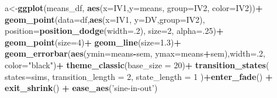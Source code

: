 \documentclass[
]{book}
\newenvironment{Shaded}{\begin{snugshade}}{\end{snugshade}}
\newcommand{\DataTypeTok}[1]{\textcolor[rgb]{0.13,0.29,0.53}{#1}}
\newcommand{\DecValTok}[1]{\textcolor[rgb]{0.00,0.00,0.81}{#1}}
\newcommand{\FloatTok}[1]{\textcolor[rgb]{0.00,0.00,0.81}{#1}}
\newcommand{\KeywordTok}[1]{\textcolor[rgb]{0.13,0.29,0.53}{\textbf{#1}}}
\newcommand{\NormalTok}[1]{#1}
\newcommand{\OperatorTok}[1]{\textcolor[rgb]{0.81,0.36,0.00}{\textbf{#1}}}
\newcommand{\StringTok}[1]{\textcolor[rgb]{0.31,0.60,0.02}{#1}}
\begin{document}
\begin{Shaded}
\begin{Highlighting}[]
{{{{\NormalTok{a<-}\KeywordTok{ggplot}\NormalTok{(means_df, }\KeywordTok{aes}\NormalTok{(}\DataTypeTok{x=}\NormalTok{IV1,}\DataTypeTok{y=}\NormalTok{means, }
                                           \DataTypeTok{group=}\NormalTok{IV2,}
                                           \DataTypeTok{color=}\NormalTok{IV2))}\OperatorTok{+}
\StringTok{  }\KeywordTok{geom_point}\NormalTok{(}\DataTypeTok{data=}\NormalTok{df,}\KeywordTok{aes}\NormalTok{(}\DataTypeTok{x=}\NormalTok{IV1, }\DataTypeTok{y=}\NormalTok{DV,}\DataTypeTok{group=}\NormalTok{IV2), }
             \DataTypeTok{position=}\KeywordTok{position_dodge}\NormalTok{(}\DataTypeTok{width=}\NormalTok{.}\DecValTok{2}\NormalTok{),}
             \DataTypeTok{size=}\DecValTok{2}\NormalTok{,}
             \DataTypeTok{alpha=}\NormalTok{.}\DecValTok{25}\NormalTok{)}\OperatorTok{+}
\StringTok{  }\KeywordTok{geom_point}\NormalTok{(}\DataTypeTok{size=}\DecValTok{4}\NormalTok{)}\OperatorTok{+}
\StringTok{  }\KeywordTok{geom_line}\NormalTok{(}\DataTypeTok{size=}\FloatTok{1.3}\NormalTok{)}\OperatorTok{+}
\StringTok{  }\KeywordTok{geom_errorbar}\NormalTok{(}\KeywordTok{aes}\NormalTok{(}\DataTypeTok{ymin=}\NormalTok{means}\OperatorTok{-}\NormalTok{sem, }\DataTypeTok{ymax=}\NormalTok{means}\OperatorTok{+}\NormalTok{sem),}\DataTypeTok{width=}\NormalTok{.}\DecValTok{2}\NormalTok{,}
                \DataTypeTok{color=}\StringTok{"black"}\NormalTok{)}\OperatorTok{+}
\StringTok{  }\KeywordTok{theme_classic}\NormalTok{(}\DataTypeTok{base_size =} \DecValTok{20}\NormalTok{)}\OperatorTok{+}
\StringTok{  }\KeywordTok{transition_states}\NormalTok{(}
    \DataTypeTok{states=}\NormalTok{sims,}
    \DataTypeTok{transition_length =} \DecValTok{2}\NormalTok{,}
    \DataTypeTok{state_length =} \DecValTok{1}
\NormalTok{  )}\OperatorTok{+}\KeywordTok{enter_fade}\NormalTok{() }\OperatorTok{+}\StringTok{ }
\StringTok{  }\KeywordTok{exit_shrink}\NormalTok{() }\OperatorTok{+}
\StringTok{  }\KeywordTok{ease_aes}\NormalTok{(}\StringTok{'sine-in-out'}\NormalTok{)}

}}}}
\end{Highlighting}
\end{Shaded}
\end{document}
